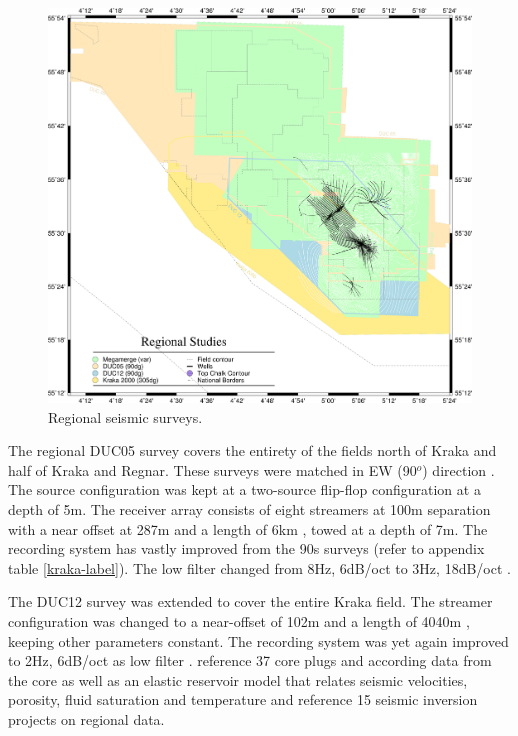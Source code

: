 \begin{figure}[!hbt]
\centering
\includegraphics[width=\textwidth]{figures/data/regional.png}
\caption{Regional seismic surveys.}
\end{figure}

The regional DUC05 survey covers the entirety of the fields north of Kraka and half of Kraka and Regnar. These surveys were matched in EW (90$^o$) direction \citep{Calvert2014}. The source configuration was kept at a two-source flip-flop configuration at a depth of 5m. The receiver array consists of eight streamers at 100m separation with a near offset at 287m and a length of 6km \citep{Svay2013}, towed at a depth of 7m. The recording system has vastly improved from the 90s surveys (refer to appendix table \ref{kraka-label}). The low filter changed from 8Hz, 6dB/oct to 3Hz, 18dB/oct \citep{Calvert2014}.

The DUC12 survey was extended to cover the entire Kraka field. The streamer configuration was changed to a near-offset of 102m and a length of 4040m \citep{Svay2013}, keeping other parameters constant. The recording system was yet again improved to 2Hz, 6dB/oct as low filter \citep{Calvert2014}. \citet{Dorn-Lopez2005} reference 37 core plugs and according data from the core as well as an elastic reservoir model that relates seismic velocities, porosity, fluid saturation and temperature and \citet{Micksch2014} reference 15 seismic inversion projects on regional data.

